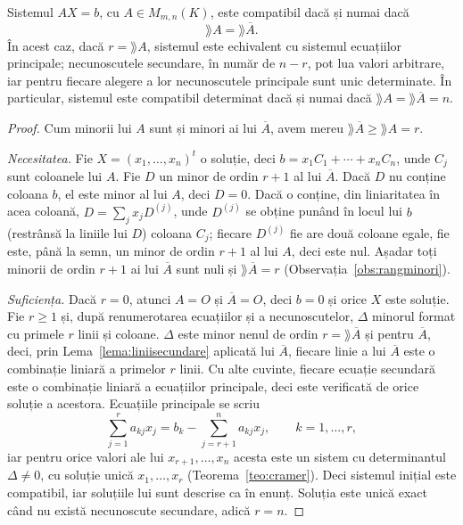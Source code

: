 \begin{teorema}\label{teo:rouche}
Sistemul $AX=b$, cu $A\in M_{m,n}(K)$, este compatibil dacă și numai dacă
\[
\rang A=\rang\overline{A}.
\]
În acest caz, dacă $r=\rang A$, sistemul este echivalent cu sistemul ecuațiilor principale; necunoscutele secundare, în număr de $n-r$, pot lua valori arbitrare, iar pentru fiecare alegere a lor necunoscutele principale sunt unic determinate. În particular, sistemul este compatibil determinat dacă și numai dacă $\rang A=\rang\overline A=n$.
\end{teorema}

\begin{proof}
Cum minorii lui $A$ sunt și minori ai lui $\overline A$, avem mereu $\rang\overline A\ge\rang A=r$.

\emph{Necesitatea.} Fie $X=(x_1,\dots,x_n)^t$ o soluție, deci $b=x_1C_1+\cdots+x_nC_n$, unde $C_j$ sunt coloanele lui $A$. Fie $D$ un minor de ordin $r+1$ al lui $\overline A$. Dacă $D$ nu conține coloana $b$, el este minor al lui $A$, deci $D=0$. Dacă o conține, din liniaritatea în acea coloană, $D=\sum_jx_jD^{(j)}$, unde $D^{(j)}$ se obține punând în locul lui $b$ (restrânsă la liniile lui $D$) coloana $C_j$; fiecare $D^{(j)}$ fie are două coloane egale, fie este, până la semn, un minor de ordin $r+1$ al lui $A$, deci este nul. Așadar toți minorii de ordin $r+1$ ai lui $\overline A$ sunt nuli și $\rang\overline A=r$ (Observația~\ref{obs:rangminori}).

\emph{Suficiența.} Dacă $r=0$, atunci $A=O$ și $\overline A=O$, deci $b=0$ și orice $X$ este soluție. Fie $r\ge1$ și, după renumerotarea ecuațiilor și a necunoscutelor, $\Delta$ minorul format cu primele $r$ linii și coloane. $\Delta$ este minor nenul de ordin $r=\rang\overline A$ și pentru $\overline A$, deci, prin Lema~\ref{lema:liniisecundare} aplicată lui $\overline A$, fiecare linie a lui $\overline A$ este o combinație liniară a primelor $r$ linii. Cu alte cuvinte, fiecare ecuație secundară este o combinație liniară a ecuațiilor principale, deci este verificată de orice soluție a acestora. Ecuațiile principale se scriu
\[
\sum_{j=1}^r a_{kj}x_j=b_k-\sum_{j=r+1}^n a_{kj}x_j,\qquad k=1,\dots,r,
\]
iar pentru orice valori ale lui $x_{r+1},\dots,x_n$ acesta este un sistem cu determinantul $\Delta\neq0$, cu soluție unică $x_1,\dots,x_r$ (Teorema~\ref{teo:cramer}). Deci sistemul inițial este compatibil, iar soluțiile lui sunt descrise ca în enunț. Soluția este unică exact când nu există necunoscute secundare, adică $r=n$.
\end{proof}

